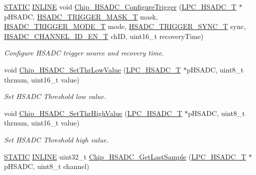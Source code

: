 \begin{DoxyCompactItemize}
\hyperlink{group___l_p_c___types___public___macros_ga10b2d890d871e1489bb02b7e70d9bdfb}{S\+T\+A\+T\+IC} \hyperlink{spifi__18xx__43xx_8h_a2eb6f9e0395b47b8d5e3eeae4fe0c116}{I\+N\+L\+I\+NE} void \hyperlink{group___h_s_a_d_c__18_x_x__43_x_x_ga8c4af826fb55c7aa1dfe4cf96cb1b1c2}{Chip\+\_\+\+H\+S\+A\+D\+C\+\_\+\+Configure\+Trigger} (\hyperlink{struct_l_p_c___h_s_a_d_c___t}{L\+P\+C\+\_\+\+H\+S\+A\+D\+C\+\_\+T} $\ast$p\+H\+S\+A\+DC, \hyperlink{group___h_s_a_d_c__18_x_x__43_x_x_gabacdffe94b42f1dc1c339dab9a20772c}{H\+S\+A\+D\+C\+\_\+\+T\+R\+I\+G\+G\+E\+R\+\_\+\+M\+A\+S\+K\+\_\+T} mask, \hyperlink{group___h_s_a_d_c__18_x_x__43_x_x_gab4aa68023c03604cc1333eed859073e9}{H\+S\+A\+D\+C\+\_\+\+T\+R\+I\+G\+G\+E\+R\+\_\+\+M\+O\+D\+E\+\_\+T} mode, \hyperlink{group___h_s_a_d_c__18_x_x__43_x_x_ga2b37f3b76e8523e0035f2b275ddb36ce}{H\+S\+A\+D\+C\+\_\+\+T\+R\+I\+G\+G\+E\+R\+\_\+\+S\+Y\+N\+C\+\_\+T} sync, \hyperlink{group___h_s_a_d_c__18_x_x__43_x_x_ga4033a9f5f07fbc57e03d0592680729c6}{H\+S\+A\+D\+C\+\_\+\+C\+H\+A\+N\+N\+E\+L\+\_\+\+I\+D\+\_\+\+E\+N\+\_\+T} ch\+ID, uint16\+\_\+t recovery\+Time)
\begin{DoxyCompactList}\small\item\em Configure H\+S\+A\+DC trigger source and recovery time. \end{DoxyCompactList}\item 
void \hyperlink{group___h_s_a_d_c__18_x_x__43_x_x_ga86ed5ab3da9ea3a6bbfd138530d5d73d}{Chip\+\_\+\+H\+S\+A\+D\+C\+\_\+\+Set\+Thr\+Low\+Value} (\hyperlink{struct_l_p_c___h_s_a_d_c___t}{L\+P\+C\+\_\+\+H\+S\+A\+D\+C\+\_\+T} $\ast$p\+H\+S\+A\+DC, uint8\+\_\+t thrnum, uint16\+\_\+t value)
\begin{DoxyCompactList}\small\item\em Set H\+S\+A\+DC Threshold low value. \end{DoxyCompactList}\item 
void \hyperlink{group___h_s_a_d_c__18_x_x__43_x_x_ga0690a0edb51bd4070384c35196f1a73d}{Chip\+\_\+\+H\+S\+A\+D\+C\+\_\+\+Set\+Thr\+High\+Value} (\hyperlink{struct_l_p_c___h_s_a_d_c___t}{L\+P\+C\+\_\+\+H\+S\+A\+D\+C\+\_\+T} $\ast$p\+H\+S\+A\+DC, uint8\+\_\+t thrnum, uint16\+\_\+t value)
\begin{DoxyCompactList}\small\item\em Set H\+S\+A\+DC Threshold high value. \end{DoxyCompactList}\item 
\hyperlink{group___l_p_c___types___public___macros_ga10b2d890d871e1489bb02b7e70d9bdfb}{S\+T\+A\+T\+IC} \hyperlink{spifi__18xx__43xx_8h_a2eb6f9e0395b47b8d5e3eeae4fe0c116}{I\+N\+L\+I\+NE} uint32\+\_\+t \hyperlink{group___h_s_a_d_c__18_x_x__43_x_x_ga6bcc415a97846f5d97ebd62a7606606f}{Chip\+\_\+\+H\+S\+A\+D\+C\+\_\+\+Get\+Last\+Sample} (\hyperlink{struct_l_p_c___h_s_a_d_c___t}{L\+P\+C\+\_\+\+H\+S\+A\+D\+C\+\_\+T} $\ast$p\+H\+S\+A\+DC, uint8\+\_\+t channel)

\end{DoxyCompactItemize}
